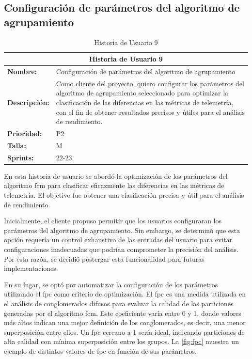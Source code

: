\subsection{Configuración de parámetros del algoritmo de agrupamiento}
\begin{table}[H]
\centering
\begin{tabular}{|l|p{10cm}|}
\hline
\multicolumn{2}{|c|}{\textbf{Historia de Usuario 9}} \\ \hline
\textbf{Nombre:} & Configuración de parámetros del algoritmo de agrupamiento \\ \hline
\textbf{Descripción:} & Como cliente del proyecto, quiero configurar los parámetros del algoritmo de agrupamiento seleccionado para optimizar la clasificación de las diferencias en las métricas de telemetría, con el fin de obtener resultados precisos y útiles para el análisis de rendimiento. \\ \hline
\textbf{Prioridad:} & P2 \\ \hline
\textbf{Talla:} & M \\ \hline
\textbf{Sprints:} & 22-23 \\ \hline
\end{tabular}
\caption{Historia de Usuario 9}
\label{tab:configurar_algoritmos_agrupamiento}
\end{table}


En esta historia de usuario se abordó la optimización de los parámetros del algoritmo \ac{fcm} para clasificar eficazmente las diferencias en las métricas de telemetría. El objetivo fue obtener una clasificación precisa y útil para el análisis de rendimiento.

Inicialmente, el cliente propuso permitir que los usuarios configuraran los parámetros del algoritmo de agrupamiento. Sin embargo, se determinó que esta opción requería un control exhaustivo de las entradas del usuario para evitar configuraciones inadecuadas que podrían comprometer la precisión del análisis. Por esta razón, se decidió postergar esta funcionalidad para futuras implementaciones.

En su lugar, se optó por automatizar la configuración de los parámetros utilizando el \ac{fpc} como criterio de optimización. El \ac{fpc} es una medida utilizada en el análisis de conglomerados difusos para evaluar la calidad de las particiones generadas por el algoritmo \ac{fcm}. Este coeficiente varía entre 0 y 1, donde valores más altos indican una mejor definición de los conglomerados, es decir, una menor superposición entre ellos. Un \ac{fpc} cercano a 1 sería ideal, indicando particiones de alta calidad con mínima superposición entre los grupos. La \autoref{fig:fpc} muestra un ejemplo de distintos valores de \ac{fpc} en función de sus parámetros.

